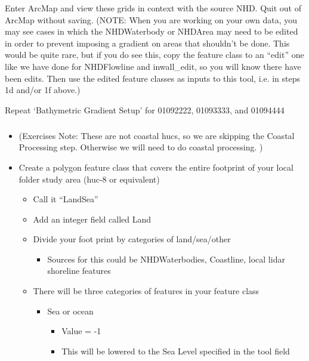 \documentclass[letterpaper,10pt,english]{sphinxmanual}
\begin{document}
Enter ArcMap and view these grids in context with the source NHD.  Quit out of ArcMap without saving. (NOTE: When you are working on your own data, you may see cases in which the NHDWaterbody or NHDArea may need to be edited in order to prevent imposing a gradient on areas that shouldn’t be done. This would be quite rare, but if you do see this, copy the feature class to an “edit” one like we have done for NHDFlowline and inwall\_edit, so you will know there have been edits. Then use the edited feature classes as inputs to this tool, i.e. in steps 1d and/or 1f above.)

Repeat ‘Bathymetric Gradient Setup’ for 01092222, 01093333, and 01094444


\subparagraph{}
\label{\detokenize{ex_1:b-coastal-processing}}\begin{itemize}
\item {} 
(Exercises Note: These are not coastal hucs, so we are skipping the Coastal Processing step. Otherwise we will need to do coastal processing.  )

\item {} 
Create a polygon feature class that covers the entire footprint of your local folder study area (huc-8 or equivalent)
\begin{itemize}
\item {} 
Call it “LandSea”

\item {} 
Add an integer field called Land

\item {} 
Divide your foot print by categories of land/sea/other
\begin{itemize}
\item {} 
Sources for this could be NHDWaterbodies, Coastline, local lidar shoreline features

\end{itemize}

\item {} 
There will be three categories of features in your feature class
\begin{itemize}
\item {} 
Sea or ocean
\begin{itemize}
\item {} 
Value = -1

\item {} 
This will be lowered to the Sea Level specified in the tool field

\end{itemize}


\end{itemize}
\end{itemize}
\end{itemize}
\end{document}
